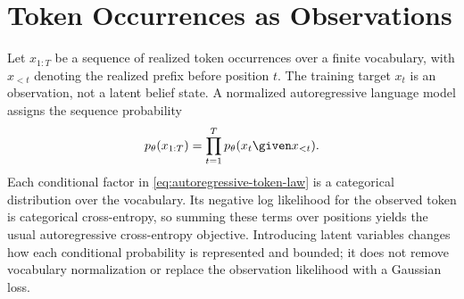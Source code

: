 \chapter{Token Occurrences as Observations}

Let $x_{1:T}$ be a sequence of realized token occurrences over a finite vocabulary, with $x_{<t}$ denoting the realized prefix before position $t$. The training target $x_t$ is an observation, not a latent belief state. A normalized autoregressive language model assigns the sequence probability
\begin{equation}
p_\theta(x_{1:T})=\prod_{t=1}^{T}p_\theta(x_t\given x_{<t}).
\label{eq:autoregressive-token-law}
\end{equation}
Each conditional factor in \cref{eq:autoregressive-token-law} is a categorical distribution over the vocabulary. Its negative log likelihood for the observed token is categorical cross-entropy, so summing these terms over positions yields the usual autoregressive cross-entropy objective. Introducing latent variables changes how each conditional probability is represented and bounded; it does not remove vocabulary normalization or replace the observation likelihood with a Gaussian loss.

